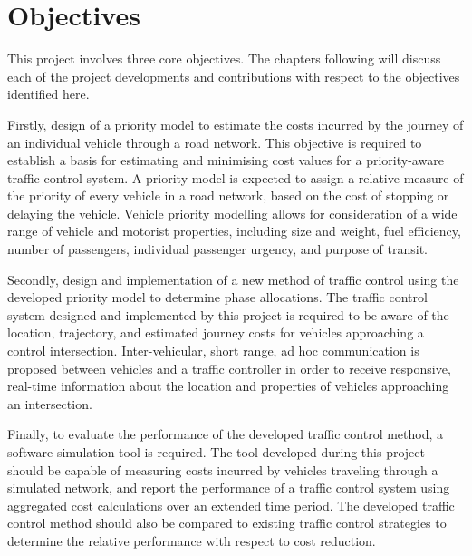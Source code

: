 \section{Objectives}

This project involves three core objectives. The chapters following will discuss each of the project developments and contributions with respect to the objectives identified here.

Firstly, design of a priority model to estimate the costs incurred by the journey of an individual vehicle through a road network. This objective is required to establish a basis for estimating and minimising cost values for a priority-aware traffic control system. A priority model is expected to assign a relative measure of the priority of every vehicle in a road network, based on the cost of stopping or delaying the vehicle. Vehicle priority modelling allows for consideration of a wide range of vehicle and motorist properties, including size and weight, fuel efficiency, number of passengers, individual passenger urgency, and purpose of transit. 

Secondly, design and implementation of a new method of traffic control using the developed priority model to determine phase allocations. The traffic control system designed and implemented by this project is required to be aware of the location, trajectory, and estimated journey costs for vehicles approaching a control intersection. Inter-vehicular, short range, ad hoc communication is proposed between vehicles and a traffic controller in order to receive responsive, real-time information about the location and properties of vehicles approaching an intersection. 

Finally, to evaluate the performance of the developed traffic control method, a software simulation tool is required. The tool developed during this project should be capable of measuring costs incurred by vehicles traveling through a simulated network, and report the performance of a traffic control system using aggregated cost calculations over an extended time period. The developed traffic control method should also be compared to existing traffic control strategies to determine the relative performance with respect to cost reduction.


